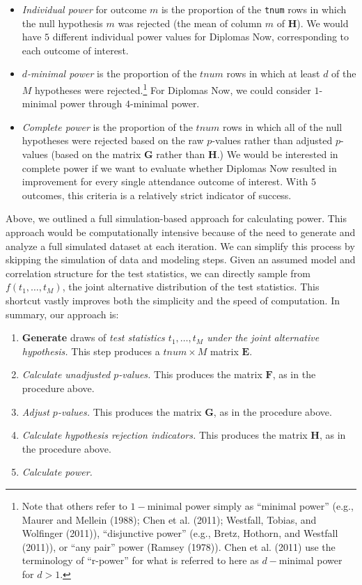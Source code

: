 \documentclass[
]{article}
\providecommand{\tightlist}{%
  \setlength{\itemsep}{0pt}\setlength{\parskip}{0pt}}
\begin{document}
\begin{itemize}
\item
  \emph{Individual power} for outcome \(m\) is the proportion of the
  \texttt{tnum} rows in which the null hypothesis \(m\) was rejected
  (the mean of column \(m\) of \(\mathbf{H}\)). We would have \(5\)
  different individual power values for Diplomas Now, corresponding to
  each outcome of interest.
\item
  \emph{\(d\)-minimal power} is the proportion of the \(tnum\) rows in
  which at least \(d\) of the \(M\) hypotheses were rejected.\footnote{Note
    that others refer to \(1-\)minimal power simply as ``minimal power''
    (e.g., Maurer and Mellein (1988); Chen et al. (2011); Westfall,
    Tobias, and Wolfinger (2011)), ``disjunctive power'' (e.g., Bretz,
    Hothorn, and Westfall (2011)), or ``any pair'' power (Ramsey
    (1978)). Chen et al. (2011) use the terminology of ``r-power'' for
    what is referred to here as \(d-\)minimal power for \(d>1\).} For
  Diplomas Now, we could consider \(1\)-minimal power through
  \(4\)-minimal power.
\item
  \emph{Complete power} is the proportion of the \(tnum\) rows in which
  all of the null hypotheses were rejected based on the raw \(p\)-values
  rather than adjusted \(p\)-values (based on the matrix \(\mathbf{G}\)
  rather than \(\mathbf{H}\).) We would be interested in complete power
  if we want to evaluate whether Diplomas Now resulted in improvement
  for every single attendance outcome of interest. With \(5\) outcomes,
  this criteria is a relatively strict indicator of success.
\end{itemize}

Above, we outlined a full simulation-based approach for calculating
power. This approach would be computationally intensive because of the
need to generate and analyze a full simulated dataset at each iteration.
We can simplify this process by skipping the simulation of data and
modeling steps. Given an assumed model and correlation structure for the
test statistics, we can directly sample from \(f(t_1, \dots, t_M)\), the
joint alternative distribution of the test statistics. This shortcut
vastly improves both the simplicity and the speed of computation. In
summary, our approach is:

\begin{enumerate}
\def\labelenumi{\arabic{enumi}.}
\tightlist
\item
  \textbf{Generate} draws of \emph{test statistics \(t_1, \dots, t_M\)
  under the joint alternative hypothesis.} This step produces a
  \(tnum \times M\) matrix \(\mathbf{E}\).
\item
  \emph{Calculate unadjusted \(p\)-values.} This produces the matrix
  \(\mathbf{F}\), as in the procedure above.
\item
  \emph{Adjust \(p\)-values.} This produces the matrix \(\mathbf{G}\),
  as in the procedure above.
\item
  \emph{Calculate hypothesis rejection indicators.} This produces the
  matrix \(\mathbf{H}\), as in the procedure above.
\item
  \emph{Calculate power.}
\end{enumerate}
\end{document}
